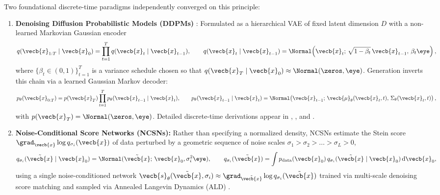 \documentclass[../../../../master.tex]{subfiles}
\begin{document}
Two foundational discrete-time paradigms independently converged on this principle:
{\sloppy
\begin{enumerate}
  \item \textbf{Denoising Diffusion Probabilistic Models (DDPMs)} : Formulated as a hierarchical VAE of fixed latent dimension $D$ with a non-learned Markovian Gaussian encoder
  \begin{equation}\label{eq:ddpm:forward_chain}
    q(\vecb{x}_{1:T} \mid \vecb{x}_0) = \prod_{t=1}^T q(\vecb{x}_t \mid \vecb{x}_{t-1}), \qquad q(\vecb{x}_t \mid \vecb{x}_{t-1}) = \Normal\!\left(\vecb{x}_t;\, \sqrt{1 - \beta_t}\,\vecb{x}_{t-1},\, \beta_t \eye\right),
  \end{equation}
  where $\{\beta_t \in (0, 1)\}_{t=1}^T$ is a variance schedule chosen so that $q(\vecb{x}_T \mid \vecb{x}_0) \approx \Normal(\zeros, \eye)$. Generation inverts this chain via a learned Gaussian Markov decoder:
  \begin{equation}\label{eq:ddpm:reverse_chain}
    p_\theta(\vecb{x}_{0:T}) = p(\vecb{x}_T)\prod_{t=1}^T p_\theta(\vecb{x}_{t-1} \mid \vecb{x}_t), \qquad p_\theta(\vecb{x}_{t-1} \mid \vecb{x}_t) = \Normal\!\left(\vecb{x}_{t-1};\, \vecb{\mu}_\theta(\vecb{x}_t, t),\, \Sigma_\theta(\vecb{x}_t, t)\right),
  \end{equation}
  with $p(\vecb{x}_T) = \Normal(\zeros, \eye)$. Detailed discrete-time derivations appear in , , and .
  \item \textbf{Noise-Conditional Score Networks (NCSNs):} Rather than specifying a normalized density, NCSNs estimate the Stein score $\grad_{\vecb{x}} \log q_{\sigma_i}(\vecb{x})$ of data perturbed by a geometric sequence of noise scales $\sigma_1 > \sigma_2 > \dots > \sigma_L > 0$,
  \begin{equation}\label{eq:ddpm:ncsn_kernel}
    q_{\sigma_i}(\tilde{\vecb{x}} \mid \vecb{x}_0) = \Normal(\tilde{\vecb{x}};\, \vecb{x}_0, \sigma_i^2 \eye), \qquad q_{\sigma_i}(\tilde{\vecb{x}}) = \int p_{\mathrm{data}}(\vecb{x}_0)\, q_{\sigma_i}(\tilde{\vecb{x}} \mid \vecb{x}_0)\,\mathrm{d}\vecb{x}_0,
  \end{equation}
  using a single noise-conditioned network $\vecb{s}_\theta(\tilde{\vecb{x}}, \sigma_i) \approx \grad_{\tilde{\vecb{x}}} \log q_{\sigma_i}(\tilde{\vecb{x}})$ trained via multi-scale denoising score matching and sampled via Annealed Langevin Dynamics (ALD)   .
\end{enumerate}
\par}
\end{document}
